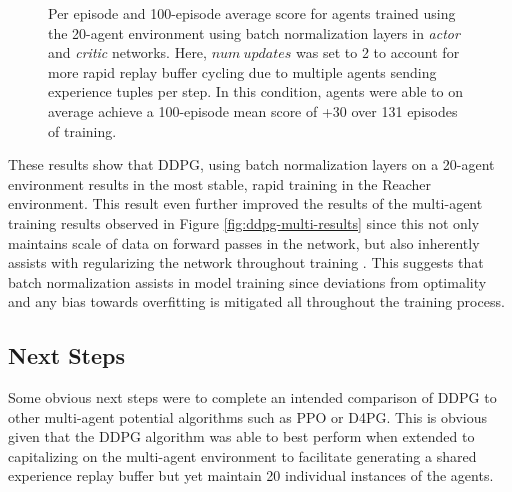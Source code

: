\documentclass[11pt]{article}
\begin{document}
	\FloatBarrier
	
	\begin{figure}[!ht]
		\centering
		\caption{Per episode and 100-episode average score for agents trained using the 20-agent environment using batch normalization layers in \textit{actor} and \textit{critic} networks. Here, $num\ updates$ was set to 2 to account for more rapid replay buffer cycling due to multiple agents sending experience tuples per step. In this condition, agents were able to on average achieve a 100-episode mean score of +30 over 131 episodes of training.}
		\label{fig:ddpg-multi-batch-results}
	\end{figure}
	
	\FloatBarrier
	
	These results show that DDPG, using batch normalization layers on a 20-agent environment results in the most stable, rapid training in the Reacher environment. This result even further improved the results of the multi-agent training results observed in Figure \ref{fig:ddpg-multi-results} since this not only maintains scale of data on forward passes in the network, but also inherently assists with regularizing the network throughout training \cite{batch}. This suggests that batch normalization assists in model training since deviations from optimality and any bias towards overfitting is mitigated all throughout the training process.
	
	
	\subsection{Next Steps}
	
	Some obvious next steps were to complete an intended comparison of DDPG to other multi-agent potential algorithms such as PPO or D4PG. This is obvious given that the DDPG algorithm was able to best perform when extended to capitalizing on the multi-agent environment to facilitate generating a shared experience replay buffer but yet maintain 20 individual instances of the agents.
	
\end{document}
